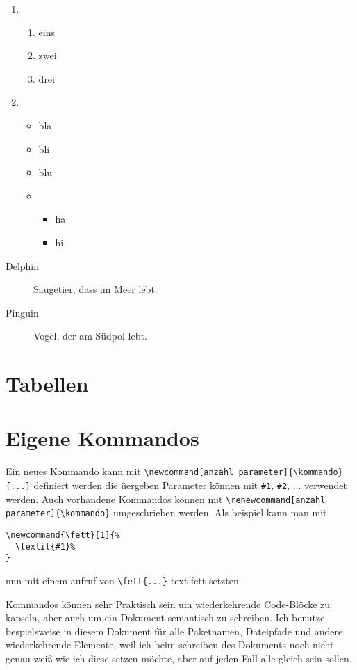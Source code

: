 \begin{enumerate}
\item
  \begin{enumerate}
  \item eins
  \item zwei
  \item drei
  \end{enumerate}
\item
  \begin{itemize}
  \item bla
  \item bli
  \item blu
  \item
    \begin{itemize}
    \item ha
    \item hi
    \end{itemize}
  \end{itemize}
\end{enumerate}
\begin{description}
\item[Delphin] Säugetier, dass im Meer lebt.
\item[Pinguin] Vogel, der am Südpol lebt. 
\end{description}

\section{Tabellen}

\section{Eigene Kommandos}\label{sec:customCommands}
Ein neues Kommando kann mit \verb+\newcommand[anzahl parameter]{\kommando}{...}+ definiert werden
die üergeben Parameter können mit \verb+#1+, \verb+#2+, ... verwendet werden. Auch vorhandene Kommandos
können mit \verb+\renewcommand[anzahl parameter]{\kommando}+ umgeschrieben werden. Als beispiel kann man mit
\begin{verbatim}
\newcommand{\fett}[1]{%
  \textit{#1}%
}
\end{verbatim}
nun mit einem aufruf von \verb+\fett{...}+ text fett setzten.

Kommandos können sehr Praktisch sein um wiederkehrende Code-Blöcke zu kapseln, aber auch um ein Dokument
semantisch zu schreiben. Ich benutze bespielsweise in diesem Dokument für alle Paketnamen, Dateipfade und
andere wiederkehrende Elemente, weil ich beim schreiben des Dokuments noch nicht genau weiß wie ich diese
setzen möchte, aber auf jeden Fall alle gleich sein sollen. 

